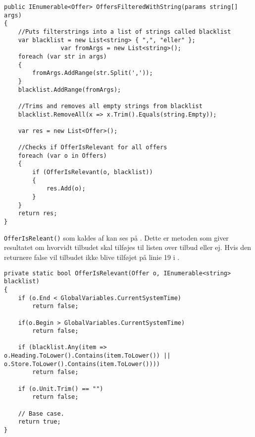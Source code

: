 \begin{lstlisting}[caption={\class{OffersFilteredByUserPref} er metoden, der filtrerer \class{Offers} på baggrund af uønskede strenge.}, label=OffersFilteredByUserPrefs] 
public IEnumerable<Offer> OffersFilteredWithString(params string[] args)
{
	//Puts filterstrings into a list of strings called blacklist
    var blacklist = new List<string> { ",", "eller" };
                var fromArgs = new List<string>();
    foreach (var str in args)
    {
        fromArgs.AddRange(str.Split(','));
    }
    blacklist.AddRange(fromArgs);
    
    //Trims and removes all empty strings from blacklist
    blacklist.RemoveAll(x => x.Trim().Equals(string.Empty));

    var res = new List<Offer>();

	//Checks if OfferIsRelevant for all offers
    foreach (var o in Offers)
    {
        if (OfferIsRelevant(o, blacklist))
        {
            res.Add(o);
        }
    }
    return res;
}
\end{lstlisting}

\texttt{OfferIsReleant()} som kaldes af  kan ses på . Dette er metoden som giver resultatet om hvorvidt tilbudet skal tilføjes til listen over tilbud eller ej. Hvis den returnere false vil tilbudet ikke blive tilføjet på linie 19 i .

\begin{lstlisting}[caption=Denne metode kaldet af OffersFilteredByUserPrefs\, sørger for at tilbudet som modtages som input overholder de forskellige krav sat i blacklisten. Der tjekkes også om tilbudet er passende for den nuværende systemtid. Den nuværende systemtid bruges til at ændre tiden i programmet for at loade relevant tilbud\, og bruges udelukkende til fremvisning af funktionalitet og testing. Er resultates true\, tilføjes tilbudet til listen\, hvis resultatet er false tilføjes den ikke., label=OfferIsRelevant]
private static bool OfferIsRelevant(Offer o, IEnumerable<string> blacklist)
{
    if (o.End < GlobalVariables.CurrentSystemTime)
        return false;

    if(o.Begin > GlobalVariables.CurrentSystemTime)
        return false;

    if (blacklist.Any(item => o.Heading.ToLower().Contains(item.ToLower()) || o.Store.ToLower().Contains(item.ToLower())))
        return false;

    if (o.Unit.Trim() == "")
        return false;

    // Base case.
    return true;
}
\end{lstlisting}


